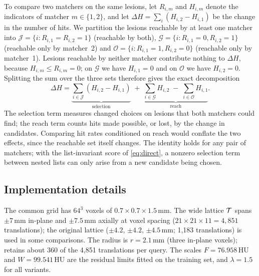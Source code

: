 To compare two matchers on the same lesions, let $R_{i,m}$ and $H_{i,m}$ denote the indicators of matcher $m \in \{1, 2\}$, and let $\Delta H = \sum_i (H_{i,2} - H_{i,1})$ be the change in the number of hits.
We partition the lesions reachable by at least one matcher into $\mathcal{J} = \{i : R_{i,1} = R_{i,2} = 1\}$ (reachable by both), $\mathcal{G} = \{i : R_{i,1} = 0, R_{i,2} = 1\}$ (reachable only by matcher~2) and $\mathcal{O} = \{i : R_{i,1} = 1, R_{i,2} = 0\}$ (reachable only by matcher~1).
Lesions reachable by neither matcher contribute nothing to $\Delta H$, because $H_{i,m} \le R_{i,m} = 0$; on $\mathcal{G}$ we have $H_{i,1} = 0$ and on $\mathcal{O}$ we have $H_{i,2} = 0$.
Splitting the sum over the three sets therefore gives the exact decomposition
\begin{equation}
\Delta H = \underbrace{\sum_{i\in\mathcal{J}} (H_{i,2} - H_{i,1})}_{\text{selection}} \;+\; \underbrace{\sum_{i\in\mathcal{G}} H_{i,2} \;-\; \sum_{i\in\mathcal{O}} H_{i,1}}_{\text{reach}} .
\label{eq:decomp}
\end{equation}
The selection term measures changed choices on lesions that both matchers could find; the reach term counts hits made possible, or lost, by the change in candidates.
Comparing hit rates conditioned on reach would conflate the two effects, since the reachable set itself changes.
The identity holds for any pair of matchers; with the list-invariant score of \cref{eq:direct}, a nonzero selection term between nested lists can only arise from a new candidate being chosen.

\subsection{Implementation details}
\label{sec:impl}
The common grid has $64^3$ voxels of $0.7\times0.7\times1.5$\,mm.
The wide lattice $\mathcal{T}$ spans $\pm7$\,mm in-plane and $\pm7.5$\,mm axially at voxel spacing ($21\times21\times11 = 4{,}851$ translations); the original lattice ($\pm4.2$, $\pm4.2$, $\pm4.5$\,mm; 1,183 translations) is used in some comparisons.
The radius is $r = 2.1$\,mm (three in-plane voxels); \ours retains about 360 of the 4,851 translations per query.
The scales $F = 76.958$\,HU and $W = 99.541$\,HU are the residual limits fitted on the training set, and $\lambda = 1.5$ for all variants.
